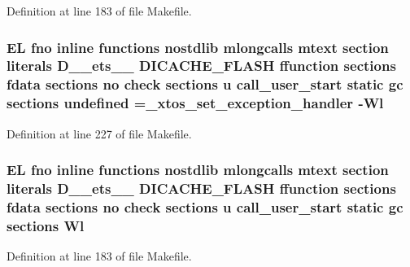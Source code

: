 Definition at line 183 of file Makefile.

\hypertarget{Makefile_a7caa220288c6621dffebfc3a50a851e1}{
\subsubsection[{undefined}]{\setlength{\rightskip}{0pt plus 5cm}E\-L fno inline functions nostdlib mlongcalls mtext section literals D\-\_\-\-\_\-ets\-\_\-\-\_\- D\-I\-C\-A\-C\-H\-E\-\_\-\-F\-L\-A\-S\-H ffunction sections fdata sections no check sections u call\-\_\-user\-\_\-start static gc sections undefined =\-\_\-xtos\-\_\-set\-\_\-exception\-\_\-handler -\/{\bf Wl}\hspace{0.3cm}{\ttfamily [static]}}}\label{Makefile_a7caa220288c6621dffebfc3a50a851e1}


Definition at line 227 of file Makefile.

\hypertarget{Makefile_a1af3a6ecef406b93f1a1db145b2cfd43}{
\subsubsection[{Wl}]{\setlength{\rightskip}{0pt plus 5cm}E\-L fno inline functions nostdlib mlongcalls mtext section literals D\-\_\-\-\_\-ets\-\_\-\-\_\- D\-I\-C\-A\-C\-H\-E\-\_\-\-F\-L\-A\-S\-H ffunction sections fdata sections no check sections u call\-\_\-user\-\_\-start static gc sections Wl}}\label{Makefile_a1af3a6ecef406b93f1a1db145b2cfd43}


Definition at line 183 of file Makefile.

